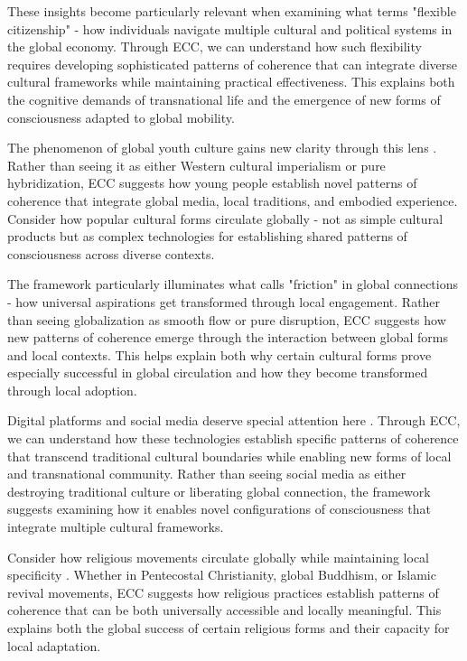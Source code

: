 These insights become particularly relevant when examining what \cite{ong1999flexible} terms "flexible citizenship" - how individuals navigate multiple cultural and political systems in the global economy. Through ECC, we can understand how such flexibility requires developing sophisticated patterns of coherence that can integrate diverse cultural frameworks while maintaining practical effectiveness. This explains both the cognitive demands of transnational life and the emergence of new forms of consciousness adapted to global mobility.

The phenomenon of global youth culture gains new clarity through this lens \cite{iwabuchi2002recentering}. Rather than seeing it as either Western cultural imperialism or pure hybridization, ECC suggests how young people establish novel patterns of coherence that integrate global media, local traditions, and embodied experience. Consider how popular cultural forms circulate globally - not as simple cultural products but as complex technologies for establishing shared patterns of consciousness across diverse contexts.

The framework particularly illuminates what \cite{tsing2005friction} calls "friction" in global connections - how universal aspirations get transformed through local engagement. Rather than seeing globalization as smooth flow or pure disruption, ECC suggests how new patterns of coherence emerge through the interaction between global forms and local contexts. This helps explain both why certain cultural forms prove especially successful in global circulation and how they become transformed through local adoption.

Digital platforms and social media deserve special attention here \cite{castells2010rise}. Through ECC, we can understand how these technologies establish specific patterns of coherence that transcend traditional cultural boundaries while enabling new forms of local and transnational community. Rather than seeing social media as either destroying traditional culture or liberating global connection, the framework suggests examining how it enables novel configurations of consciousness that integrate multiple cultural frameworks.

Consider how religious movements circulate globally while maintaining local specificity \cite{comaroff2009ethnicity}. Whether in Pentecostal Christianity, global Buddhism, or Islamic revival movements, ECC suggests how religious practices establish patterns of coherence that can be both universally accessible and locally meaningful. This explains both the global success of certain religious forms and their capacity for local adaptation.

